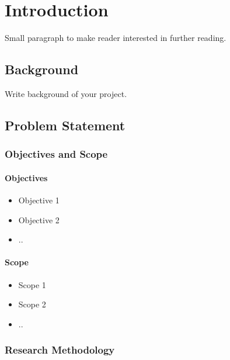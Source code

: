 \chapter{Introduction}%

Small paragraph to make reader interested in further reading. 

\section{Background}

Write background of your project.

\section{Problem Statement}

\subsection{Objectives and Scope}

\subsubsection{Objectives}
\begin{itemize}
	\item Objective 1
	\item Objective 2
	\item ..
\end{itemize}

\subsubsection{Scope}
\begin{itemize}
	\item Scope 1
	\item Scope 2
	\item ..
\end{itemize}

\subsection{Research Methodology}

